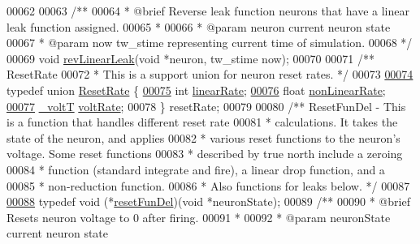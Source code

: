 \begin{DoxyCode}
00062 
00063 \textcolor{comment}{/**}
00064 \textcolor{comment}{ *  @brief  Reverse leak function neurons that have a linear leak function assigned.}
00065 \textcolor{comment}{ *}
00066 \textcolor{comment}{ *  @param neuron current neuron state}
00067 \textcolor{comment}{ *  @param now         tw\_stime representing current time of simulation.}
00068 \textcolor{comment}{ */}
00069 \textcolor{keywordtype}{void} \hyperlink{neuron_8h_a26ced40d7ad7a0b448a136d8724fe18b}{revLinearLeak}(\textcolor{keywordtype}{void} *neuron, tw\_stime now);
00070 
00071 \textcolor{comment}{/** ResetRate}
00072 \textcolor{comment}{ *  This is a support union for neuron reset rates. */}
00073 
\hypertarget{neuron_8h_source_l00074}{}\hyperlink{unionreset_rate}{00074} \textcolor{keyword}{typedef} \textcolor{keyword}{union} \hyperlink{unionreset_rate}{ResetRate} \{
\hypertarget{neuron_8h_source_l00075}{}\hyperlink{unionreset_rate_a4bf8a23e4a9874ff73208c681eae1ced}{00075}     \textcolor{keywordtype}{int} \hyperlink{unionreset_rate_a4bf8a23e4a9874ff73208c681eae1ced}{linearRate};
\hypertarget{neuron_8h_source_l00076}{}\hyperlink{unionreset_rate_a54aaba14ce85fd9c5d7b385d98727e36}{00076}     \textcolor{keywordtype}{float} \hyperlink{unionreset_rate_a54aaba14ce85fd9c5d7b385d98727e36}{nonLinearRate};
\hypertarget{neuron_8h_source_l00077}{}\hyperlink{unionreset_rate_a5a9af6c017d8b70e4db9283f2f7e726b}{00077}     \hyperlink{assist_8h_abe1fc1b8f9efd1187e564bcb8de7f815}{\_voltT} \hyperlink{unionreset_rate_a5a9af6c017d8b70e4db9283f2f7e726b}{voltRate};
00078 \} resetRate;
00079 
00080 \textcolor{comment}{/** ResetFunDel - This is a function that handles different reset rate}
00081 \textcolor{comment}{ * calculations. It takes the state of the neuron, and applies}
00082 \textcolor{comment}{ *  various reset functions to the neuron's voltage. Some reset functions}
00083 \textcolor{comment}{ * described by true north include a zeroing}
00084 \textcolor{comment}{ *  function (standard integrate and fire), a linear drop function, and a}
00085 \textcolor{comment}{ * non-reduction function.}
00086 \textcolor{comment}{ *  Also functions for leaks below. */}
00087 
\hypertarget{neuron_8h_source_l00088}{}\hyperlink{neuron_8h_ae7e5990745cd949246894bfb633ca4a2}{00088} \textcolor{keyword}{typedef} \textcolor{keywordtype}{void} (*\hyperlink{neuron_8h_ae7e5990745cd949246894bfb633ca4a2}{resetFunDel})(\textcolor{keywordtype}{void} *neuronState);
00089 \textcolor{comment}{/**}
00090 \textcolor{comment}{ *  @brief  Resets neuron voltage to 0 after firing.}
00091 \textcolor{comment}{ *}
00092 \textcolor{comment}{ *  @param neuronState current neuron state}

\end{DoxyCode}
